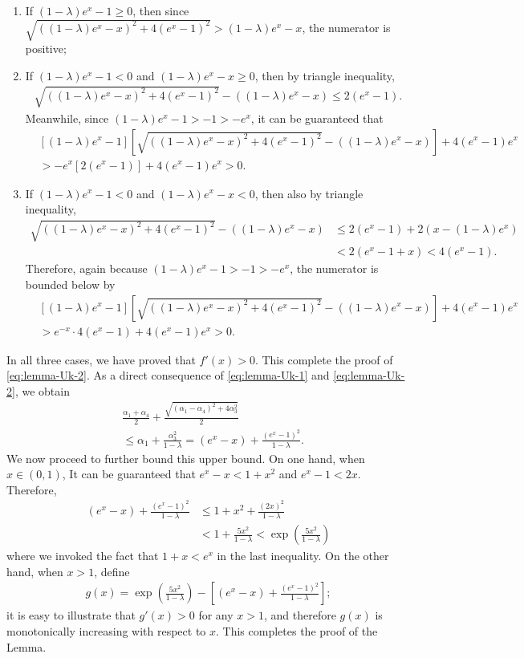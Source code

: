 \begin{enumerate}
\item If $(1-\lambda)e^x - 1 \geq 0$, then since $\sqrt{((1-\lambda)e^x - x)^2 + 4(e^x-1)^2} > (1-\lambda)e^x - x$, the numerator is positive;
\item If $(1-\lambda)e^x - 1 < 0$ and $(1-\lambda)e^x - x \geq 0$, then by triangle inequality,
\begin{align*}
\sqrt{((1-\lambda)e^x - x)^2 + 4(e^x-1)^2} - ((1-\lambda)e^x - x) \leq 2(e^x-1).
\end{align*}
Meanwhile, since $(1-\lambda)e^x - 1 > -1 > -e^x$, it can be guaranteed that
\begin{align*}
&[(1-\lambda)e^x-1]\left[\sqrt{((1-\lambda)e^x - x)^2 + 4(e^x-1)^2} - ((1-\lambda)e^x - x)\right] + 4(e^x-1)e^x \\ 
&> -e^x [2(e^x-1)]+ 4(e^x-1)e^x > 0.
\end{align*}
\item If $(1-\lambda)e^x - 1 < 0$ and $(1-\lambda)e^x - x < 0$, then also by triangle inequality,
\begin{align*}
\sqrt{((1-\lambda)e^x - x)^2 + 4(e^x-1)^2} - ((1-\lambda)e^x - x) &\leq 2(e^x-1) + 2(x-(1-\lambda)e^x) \\ 
& < 2(e^x-1 + x) < 4(e^x-1).
\end{align*}
Therefore, again because $(1-\lambda)e^x - 1 > -1 > -e^x$, the numerator is bounded below by
\begin{align*}
&[(1-\lambda)e^x-1]\left[\sqrt{((1-\lambda)e^x - x)^2 + 4(e^x-1)^2} - ((1-\lambda)e^x - x)\right] + 4(e^x-1)e^x \\ 
&> e^{-x} \cdot 4(e^x-1) + 4(e^x-1)e^x > 0.
\end{align*}
\end{enumerate}
In all three cases, we have proved that $f'(x) > 0$. This complete the proof of \eqref{eq:lemma-Uk-2}. As a direct consequence of \eqref{eq:lemma-Uk-1} and \eqref{eq:lemma-Uk-2}, we obtain
\begin{align*}
&\frac{\alpha_1 + \alpha_4}{2} + \frac{\sqrt{(\alpha_1 - \alpha_4)^2 + 4\alpha_3^2}}{2} \\ 
& \leq \alpha_1 + \frac{\alpha_3^2}{1-\lambda} = (e^x-x) + \frac{(e^x-1)^2}{1-\lambda}.
\end{align*}
We now proceed to further bound this upper bound. On one hand, when $x \in (0,1)$, It can be guaranteed that $e^x - x < 1+x^2$ and $e^x-1 < 2x$. Therefore,
\begin{align*}
(e^x-x) + \frac{(e^x-1)^2}{1-\lambda} &\leq 1 + x^2 + \frac{(2x)^2}{1-\lambda} \\ 
&< 1 + \frac{5x^2}{1-\lambda} < \exp\left(\frac{5x^2}{1-\lambda}\right)
\end{align*}
where we invoked the fact that $1+x < e^x$ in the last inequality. On the other hand, when $x > 1$, define
\begin{align*}
g(x) = \exp\left(\frac{5x^2}{1-\lambda}\right) - \left[(e^x-x) + \frac{(e^x-1)^2}{1-\lambda}\right];
\end{align*}
it is easy to illustrate that $g'(x) > 0$ for any $x > 1$, and therefore $g(x)$ is monotonically increasing with respect to $x$. This completes the proof of the Lemma.



